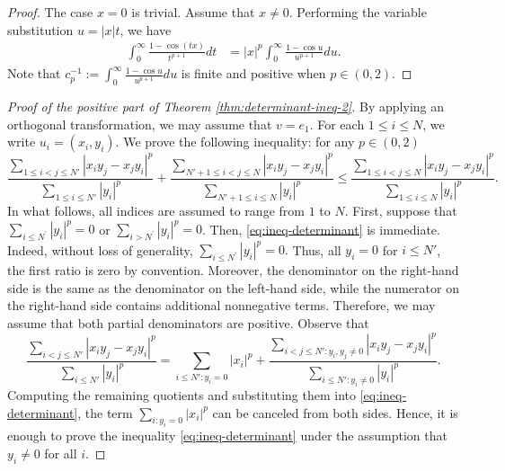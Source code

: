 \documentclass[11pt,a4paper]{amsart}
\theoremstyle{plain}
\theoremstyle{definition}
\begin{document}
\begin{proof}
The case  $x=0$ is trivial. Assume that $x \neq 0.$ Performing the variable substitution $u = |x| t$, we have
    \begin{align}
        \int_{0}^\infty \frac{1 - \cos (tx)}{t^{p+1}} dt &= |x|^p\int_{0}^\infty \frac{1 - \cos u}{u^{p+1}} du.
    \end{align}
    Note that $c_p^{-1}:=\int_{0}^\infty \frac{1 - \cos u}{u^{p+1}} du$ is finite and positive when $p \in (0,2)$.
\end{proof}
\begin{proof}[Proof of the positive part of Theorem \ref{thm:determinant-ineq-2}]
 By applying an orthogonal transformation, we may assume that
$v=e_1$.   For each $1 \leq i \leq N$, we write $u_i = (x_i,y_i)$. We prove the following inequality: for any $ p \in (0,2) $
    \begin{equation} \label{eq:ineq-determinant}
        \frac{\displaystyle\sum_{1\leq i< j \leq N'} \left| x_iy_j-x_jy_i\right|^p}{\displaystyle\sum_{1\leq i \leq N'}|y_i|^p} 
        +
        \frac{\displaystyle\sum_{N' + 1\leq i< j \leq N} \left| x_iy_j-x_jy_i\right|^p}{\displaystyle\sum_{N'+1\leq i \leq N}|y_i|^p} 
        \leq 
        \frac{\displaystyle\sum_{1\leq i< j \leq N} \left| x_iy_j-x_jy_i\right|^p}{\displaystyle\sum_{1\leq i \leq N}|y_i|^p}.
    \end{equation}
    In what follows, all indices are assumed to range from $1$ to $N$. First, suppose that $\sum_{i \leq N^{\prime}}\left|y_i\right|^p=0 $ or $ \sum_{i>N^{\prime}}\left|y_i\right|^p=0$. Then,  \eqref{eq:ineq-determinant} is immediate. Indeed, without loss of generality, $\sum_{i \leq N^{\prime}}\left|y_i\right|^p=0.$ Thus, all $y_i=0$ for $i \leq N'$, the first ratio is zero by convention. Moreover, the denominator on the right-hand side is the same as the denominator on the left-hand side, while the numerator on the right-hand side contains additional nonnegative terms. Therefore, we may assume that both partial denominators are positive.
    Observe that 
    \[
        \frac{\displaystyle\sum_{i< j \leq N'} \left| x_iy_j-x_jy_i\right|^p}{\displaystyle\sum_{ i \leq N'}|y_i|^p} 
        =
        \sum_{i \leq N': y_i =0}|x_i|^p+\frac{  \displaystyle\sum_{i< j \leq N': y_i, y_j \neq 0} \left| x_iy_j-x_jy_i\right|^p}{ \displaystyle\sum_{ i \leq N': y_i \neq 0} |y_i|^p}.
    \]
    Computing the remaining quotients and substituting them into \eqref{eq:ineq-determinant}, the term $ \sum_{i: y_i =0}|x_i|^p$ can be canceled from both sides. Hence, it is enough to prove the inequality \eqref{eq:ineq-determinant} under the assumption that $y_i \neq 0$ for all $i$.

\end{proof}
\end{document}
